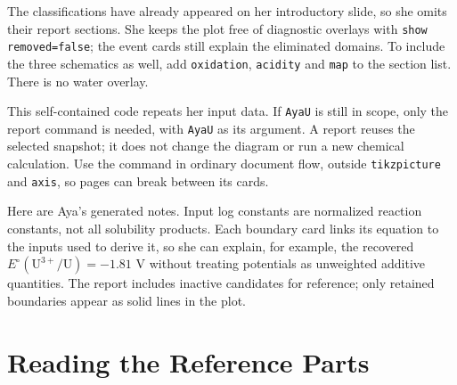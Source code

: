 \documentclass[a4paper,11pt]{ltxdoc}
\begin{document}
The classifications have already appeared on her introductory slide, so she
omits their report sections. She keeps the plot free of diagnostic overlays
with \texttt{show removed=false}; the event cards still explain the eliminated
domains. To include the three schematics as well, add \texttt{oxidation},
\texttt{acidity} and \texttt{map} to the section list. There is no water overlay.

This self-contained code repeats her input data. If \texttt{AyaU} is still in
scope, only the report command is needed, with \texttt{AyaU} as its argument.
A report reuses the selected snapshot; it does not change the diagram or run a
new chemical calculation. Use the command in ordinary document flow, outside
\texttt{tikzpicture} and \texttt{axis}, so pages can break between its cards.

\begin{codeexample}
\begingroup
{}
\endgroup
\end{codeexample}

Here are Aya's generated notes. Input log constants are normalized reaction
constants, not all solubility products. Each boundary card links its equation
to the inputs used to derive it, so she can explain, for example, the recovered
$E^\circ(\mathrm{U^{3+}/U})=-1.81$ V without treating potentials as unweighted
additive quantities. The report includes inactive candidates for reference;
only retained boundaries appear as solid lines in the plot.


\section{Reading the Reference Parts}
\end{document}

